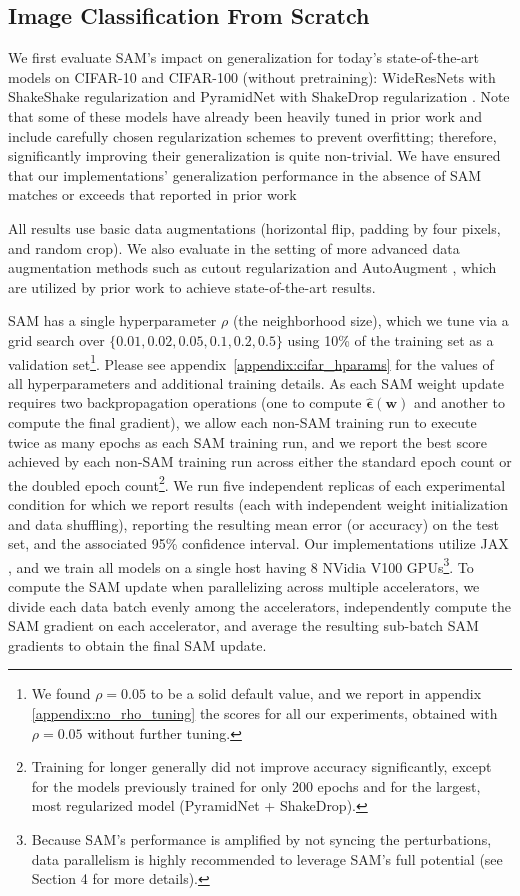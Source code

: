 \documentclass{article} %
\begin{document}
\subsection{Image Classification From Scratch}
We first evaluate SAM's impact on generalization for today's state-of-the-art models on CIFAR-10 and CIFAR-100 (without pretraining): WideResNets with ShakeShake regularization \citep{wrs, Shake} and PyramidNet with ShakeDrop regularization \citep{pyramid, shakedrop}.  Note that some of these models have already been heavily tuned in prior work and include carefully chosen regularization schemes to prevent overfitting; therefore, significantly improving their generalization is quite non-trivial. We have ensured that our implementations' generalization performance in the absence of SAM matches or exceeds that reported in prior work \citep{autoaug, fast_aa}

All results use basic data augmentations (horizontal flip, padding by four pixels, and random crop).  We also evaluate in the setting of more advanced data augmentation methods such as cutout regularization \citep{cutout} and AutoAugment \citep{autoaug}, which are utilized by prior work to achieve state-of-the-art results.

SAM has a single hyperparameter $\rho$ (the neighborhood size), which we tune via a grid search over  $\{0.01, 0.02, 0.05, 0.1, 0.2, 0.5\}$ using 10\% of the training set as a validation set\footnote{We found $\rho=0.05$ to be a solid default value, and we report in appendix \ref{appendix:no_rho_tuning} the scores for all our experiments, obtained with $\rho=0.05$ without further tuning.}.  Please see appendix~\ref{appendix:cifar_hparams} for the values of all hyperparameters and additional training details.  As each SAM weight update requires two backpropagation operations (one to compute $\hat{\boldsymbol{\epsilon}}(\boldsymbol{w})$ and another to compute the final gradient), we allow each non-SAM training run to execute twice as many epochs as each SAM training run, and we report the best score achieved by each non-SAM training run across either the standard epoch count or the doubled epoch count\footnote{Training for longer generally did not improve accuracy significantly, except for the models previously trained for only 200 epochs and for the largest, most regularized model (PyramidNet + ShakeDrop).}.  We run five independent replicas of each experimental condition for which we report results (each with independent weight initialization and data shuffling), reporting the resulting mean error (or accuracy) on the test set, and the associated 95\% confidence interval.  Our implementations utilize JAX \citep{jax2018github}, and we train all models on a single host having 8 NVidia V100 GPUs\footnote{Because SAM's performance is amplified by not syncing the perturbations, data parallelism is highly recommended to leverage SAM's full potential (see Section 4 for more details).}.  To compute the SAM update when parallelizing across multiple accelerators, we divide each data batch evenly among the accelerators, independently compute the SAM gradient on each accelerator, and average the resulting sub-batch SAM gradients to obtain the final SAM update.
\end{document}
